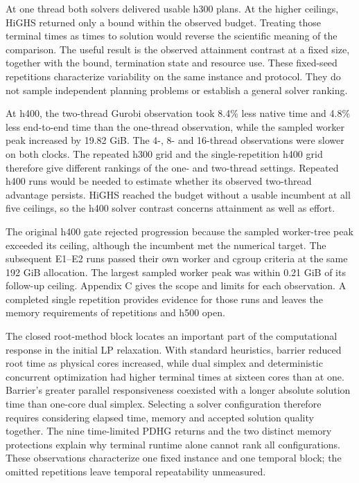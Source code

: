 \documentclass[
  english,
  11pt,
  a4paper,
  authoryear,
  preprint]{elsarticle}
\begin{document}
At one thread both solvers delivered usable h300 plans. At the higher
ceilings, HiGHS returned only a bound within the observed budget.
Treating those terminal times as times to solution would reverse the
scientific meaning of the comparison. The useful result is the observed
attainment contrast at a fixed size, together with the bound,
termination state and resource use. These fixed-seed repetitions
characterize variability on the same instance and protocol. They do not
sample independent planning problems or establish a general solver
ranking.

At h400, the two-thread Gurobi observation took 8.4\% less native time
and 4.8\% less end-to-end time than the one-thread observation, while
the sampled worker peak increased by 19.82 GiB. The 4-, 8- and 16-thread
observations were slower on both clocks. The repeated h300 grid and the
single-repetition h400 grid therefore give different rankings of the
one- and two-thread settings. Repeated h400 runs would be needed to
estimate whether its observed two-thread advantage persists. HiGHS
reached the budget without a usable incumbent at all five ceilings, so
the h400 solver contrast concerns attainment as well as effort.

The original h400 gate rejected progression because the sampled
worker-tree peak exceeded its ceiling, although the incumbent met the
numerical target. The subsequent E1--E2 runs passed their own worker and
cgroup criteria at the same 192 GiB allocation. The largest sampled
worker peak was within 0.21 GiB of its follow-up ceiling. Appendix C
gives the scope and limits for each observation. A completed single
repetition provides evidence for those runs and leaves the memory
requirements of repetitions and h500 open.

The closed root-method block locates an important part of the computational response in the initial LP relaxation. With standard heuristics, barrier reduced root time as physical cores increased, while dual simplex and deterministic concurrent optimization had higher terminal times at sixteen cores than at one. Barrier's greater parallel responsiveness coexisted with a longer absolute solution time than one-core dual simplex. Selecting a solver configuration therefore requires considering elapsed time, memory and accepted solution quality together. The nine time-limited PDHG returns and the two distinct memory protections explain why terminal runtime alone cannot rank all configurations. These observations characterize one fixed instance and one temporal block; the omitted repetitions leave temporal repeatability unmeasured.
\end{document}
